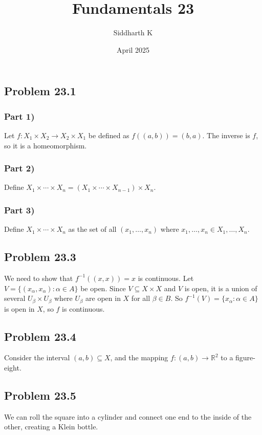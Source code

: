 \documentclass{article}
\title{Fundamentals 23}
\author{Siddharth K}
\date{April 2025}
\newcommand{\R}{\mathbb{R}}
\begin{document}
\maketitle

\subsection*{Problem 23.1}
\subsubsection*{Part 1)}
Let $f: X_1\times X_2 \to X_2 \times X_1$ be defined as $f((a, b)) = (b, a)$. The inverse is $f$, so it is a homeomorphism.

\subsubsection*{Part 2)}
Define $X_1\times \cdots \times X_n = (X_1 \times \cdots \times X_{n - 1}) \times X_n$.

\subsubsection*{Part 3)}
Define $X_1\times \cdots \times X_n$ as the set of all $(x_1, \ldots, x_n)$ where $x_1, \ldots, x_n \in X_1, \ldots, X_n$.

\subsection*{Problem 23.3}
We need to show that $f^{-1}((x, x)) = x$ is continuous. Let $V = \{(x_\alpha, x_\alpha): \alpha \in A\}$ be open. Since $V \subseteq X \times X$ and $V$ is open, it is a union of several $U_\beta \times U_\beta$ where $U_\beta$ are open in $X$ for all $\beta \in B$. So $f^{-1}(V) = \{x_\alpha: \alpha \in A\}$ is open in $X$, so $f$ is continuous.

\subsection*{Problem 23.4}
Consider the interval $(a, b) \subseteq X$, and the mapping $f: (a, b) \to \R^2$ to a figure-eight.

\subsection*{Problem 23.5}
We can roll the square into a cylinder and connect one end to the inside of the other, creating a Klein bottle.
\end{document}
